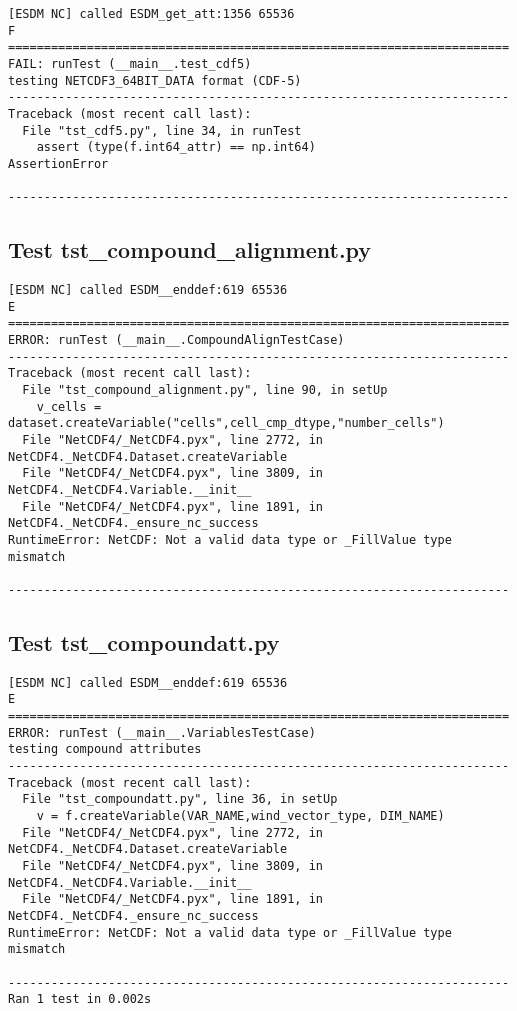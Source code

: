 \begin{verbatim}
[ESDM NC] called ESDM_get_att:1356 65536
F
======================================================================
FAIL: runTest (__main__.test_cdf5)
testing NETCDF3_64BIT_DATA format (CDF-5)
----------------------------------------------------------------------
Traceback (most recent call last):
  File "tst_cdf5.py", line 34, in runTest
    assert (type(f.int64_attr) == np.int64)
AssertionError

----------------------------------------------------------------------
\end{verbatim}

\subsection{Test tst\_compound\_alignment.py}

\begin{verbatim}
[ESDM NC] called ESDM__enddef:619 65536
E
======================================================================
ERROR: runTest (__main__.CompoundAlignTestCase)
----------------------------------------------------------------------
Traceback (most recent call last):
  File "tst_compound_alignment.py", line 90, in setUp
    v_cells = dataset.createVariable("cells",cell_cmp_dtype,"number_cells")
  File "NetCDF4/_NetCDF4.pyx", line 2772, in NetCDF4._NetCDF4.Dataset.createVariable
  File "NetCDF4/_NetCDF4.pyx", line 3809, in NetCDF4._NetCDF4.Variable.__init__
  File "NetCDF4/_NetCDF4.pyx", line 1891, in NetCDF4._NetCDF4._ensure_nc_success
RuntimeError: NetCDF: Not a valid data type or _FillValue type mismatch

----------------------------------------------------------------------
\end{verbatim}

\subsection{Test tst\_compoundatt.py}

\begin{verbatim}
[ESDM NC] called ESDM__enddef:619 65536
E
======================================================================
ERROR: runTest (__main__.VariablesTestCase)
testing compound attributes
----------------------------------------------------------------------
Traceback (most recent call last):
  File "tst_compoundatt.py", line 36, in setUp
    v = f.createVariable(VAR_NAME,wind_vector_type, DIM_NAME)
  File "NetCDF4/_NetCDF4.pyx", line 2772, in NetCDF4._NetCDF4.Dataset.createVariable
  File "NetCDF4/_NetCDF4.pyx", line 3809, in NetCDF4._NetCDF4.Variable.__init__
  File "NetCDF4/_NetCDF4.pyx", line 1891, in NetCDF4._NetCDF4._ensure_nc_success
RuntimeError: NetCDF: Not a valid data type or _FillValue type mismatch

----------------------------------------------------------------------
Ran 1 test in 0.002s
\end{verbatim}

